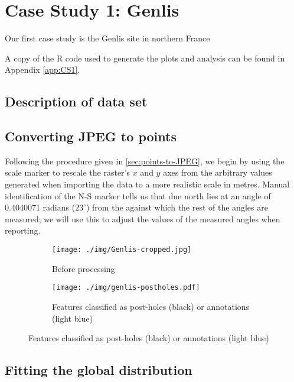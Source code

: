 \documentclass[../../ArchStats.tex]{subfiles}
\begin{document}
\section{Case Study 1: Genlis}
\label{sec:CS1}

Our first case study is the Genlis site in northern France 

A copy of the R code used to generate the plots and analysis can be found in Appendix \ref{app:CS1}.

\subsection{Description of data set}

\subsection{Converting JPEG to points}

Following the procedure given in \ref{sec:points-to-JPEG}, we begin by using the scale marker to rescale the raster's $x$ and $y$ axes from the arbitrary values generated when importing the data to a more realistic scale in metres. Manual identification of the N-S marker tells us that due north lies at an angle of 0.4040071 radians ($23^\circ$) from the  against which the rest of the angles are measured; we will use this to adjust the values of the measured angles when reporting.

\begin{figure}
\centering
\caption{Stages of pre-processing of the Genlis site plan}
\begin{subfigure}[t]{0.45\textwidth}
\caption{Before processing}
\texttt{[image: ./img/Genlis-cropped.jpg]}
\end{subfigure}
\begin{subfigure}[t]{0.45\textwidth}
\caption{Features classified as post-holes (black) or annotations (light blue)}
\texttt{[image: ./img/genlis-postholes.pdf]}
\end{subfigure}
\end{figure}

\subsection{Fitting the global distribution}
\end{document}

